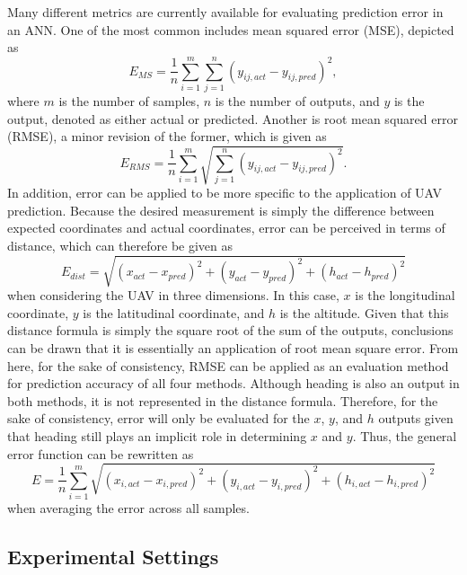 \documentclass[12pt]{uthesis-v12}  %
\begin{document}
Many different metrics are currently available for evaluating prediction error in an ANN.
One of the most common includes mean squared error (MSE), depicted as
\begin{equation}
E_{MS} = \frac{1}{n}\sum_{i=1}^m \sum_{j=1}^n (y_{ij,act}-y_{ij,pred})^2,
\label{mse}
\end{equation} 
where $m$ is the number of samples, $n$ is the number of outputs, and $y$ is the output, denoted as either actual or predicted. Another is root mean squared error (RMSE), a minor revision of the former, which is given as
\begin{equation}
E_{RMS} = \frac{1}{n}\sum_{i=1}^m \sqrt{\sum_{j=1}^n (y_{ij,act}-y_{ij,pred})^2}.
\label{rmse}
\end{equation} 
In addition, error can be applied to be more specific to the application of UAV prediction.
Because the desired measurement is simply the difference between expected coordinates and actual coordinates, error can be perceived in terms of distance, which can therefore be given as
\begin{equation}
E_{dist} = \sqrt{(x_{act}-x_{pred})^2+(y_{act}-y_{pred})^2+(h_{act}-h_{pred})^2}
\label{dist}
\end{equation}
when considering the UAV in three dimensions. In this case, $x$ is the longitudinal coordinate, $y$ is the latitudinal coordinate, and $h$ is the altitude.
Given that this distance formula is simply the square root of the sum of the outputs, conclusions can be drawn that it is essentially an application of root mean square error. From here, for the sake of consistency, RMSE can be applied as an evaluation method for prediction accuracy of all four methods. Although heading is also an output in both methods, it is not represented in the distance formula. Therefore, for the sake of consistency, error will only be evaluated for the $x$, $y$, and $h$ outputs given that heading still plays an implicit role in determining $x$ and $y$. Thus, the general error function can be rewritten as
\begin{equation}
E = \frac{1}{n}\sum_{i=1}^m \sqrt{(x_{i,act}-x_{i,pred})^2+(y_{i,act}-y_{i,pred})^2+(h_{i,act}-h_{i,pred})^2}
\label{error-final}
\end{equation}
when averaging the error across all samples.

\subsection{Experimental Settings}
\label{exp}
\end{document}

